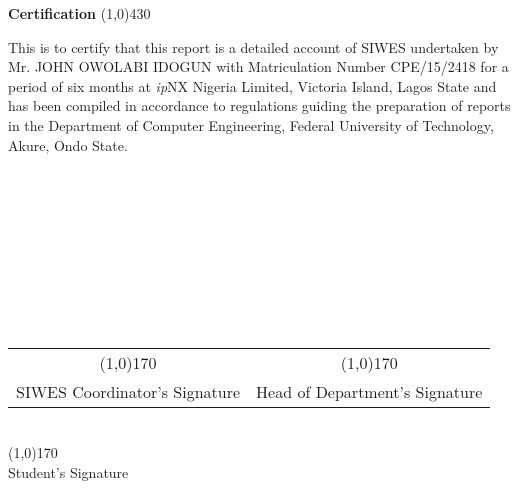 \begin{center}
{\huge \bf Certification}
\line(1,0){430}
\end{center}



This is to certify that this report is a detailed account of \ac{SIWES} undertaken by Mr. JOHN OWOLABI IDOGUN with Matriculation Number CPE/15/2418 for a period of six months at \textit{ip}NX Nigeria Limited, Victoria Island, Lagos State and has been compiled in accordance to regulations guiding the preparation of reports in the Department of Computer Engineering, Federal University of Technology, Akure, Ondo State.\\\\\\\\\\\\\\\\\\\

\begin{center}
	\begin{tabular}{c c}
	 \line(1,0){170} & \hspace{2.5cm} \line(1,0){170}\\
	 SIWES Coordinator's Signature  & \hspace{2.5cm} Head of Department's Signature\\
	\end{tabular}\\
	\vspace{1.0in}
	\line(1,0){170}\\Student's Signature
\end{center}